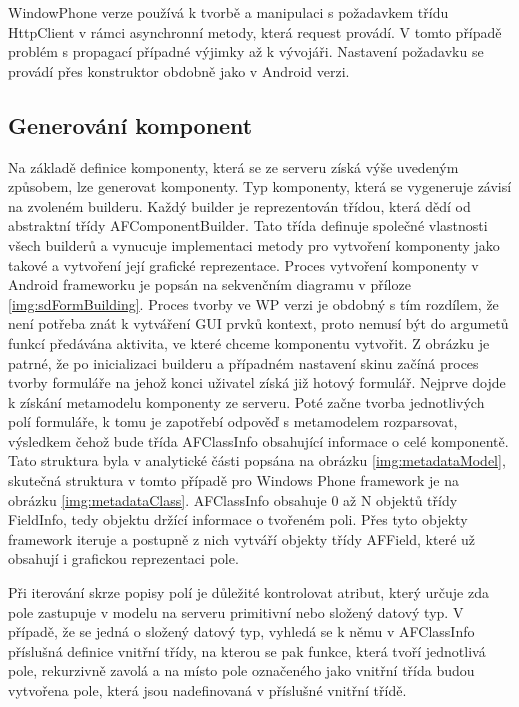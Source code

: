 WindowPhone verze používá k tvorbě a manipulaci s požadavkem třídu HttpClient \cite{wp-httpclient} v rámci asynchronní metody, která request provádí. V tomto případě problém s propagací případné výjimky až k vývojáři. Nastavení požadavku se provádí přes konstruktor obdobně jako v Android verzi. 

\subsection{Generování komponent}
Na základě definice komponenty, která se ze serveru získá výše uvedeným způsobem, lze generovat komponenty. Typ komponenty, která se vygeneruje závisí na zvoleném builderu. Každý builder je reprezentován třídou, která dědí od abstraktní třídy AFComponentBuilder. Tato třída definuje společné vlastnosti všech builderů a  vynucuje implementaci metody pro vytvoření komponenty jako takové a vytvoření její grafické reprezentace. Proces vytvoření komponenty v Android frameworku je popsán na sekvenčním diagramu v příloze \ref{img:sdFormBuilding}. Proces tvorby ve WP verzi je obdobný s tím rozdílem, že není potřeba znát k vytváření GUI prvků kontext, proto nemusí být do argumetů funkcí předávána aktivita, ve které chceme komponentu vytvořit. Z obrázku je patrné, že po inicializaci builderu a případném nastavení skinu začíná proces tvorby formuláře na jehož konci uživatel získá již hotový formulář. Nejprve dojde k získání metamodelu komponenty ze serveru. Poté začne tvorba jednotlivých polí formuláře, k tomu je zapotřebí odpověď s metamodelem rozparsovat, výsledkem čehož bude třída AFClassInfo obsahující informace o celé komponentě. Tato struktura byla v analytické části popsána na obrázku \ref{img:metadataModel}, skutečná struktura v tomto případě pro Windows Phone framework je na obrázku \ref{img:metadataClass}. AFClassInfo obsahuje 0 až N objektů třídy FieldInfo, tedy objektu držící informace o tvořeném poli. Přes tyto objekty framework iteruje a postupně z nich vytváří objekty třídy AFField, které už obsahují i grafickou reprezentaci pole. 

Při iterování skrze popisy polí je důležité kontrolovat atribut, který určuje zda pole zastupuje v modelu na serveru primitivní nebo složený datový typ. V případě, že se jedná o složený datový typ, vyhledá se k němu v AFClassInfo příslušná definice vnitřní třídy, na kterou se pak funkce, která tvoří jednotlivá pole, rekurzivně zavolá a na místo pole označeného jako vnitřní třída budou vytvořena pole, která jsou nadefinovaná v příslušné vnitřní třídě. 

